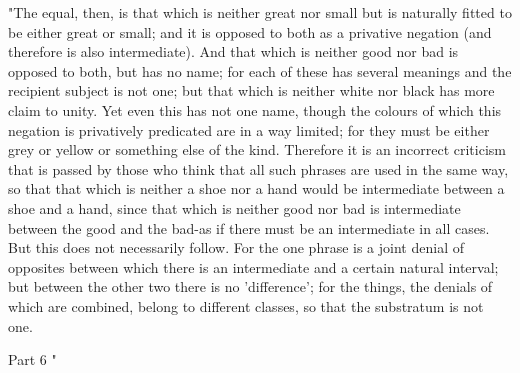 "The equal, then, is that which is neither great nor small but is
naturally fitted to be either great or small; and it is opposed to
both as a privative negation (and therefore is also intermediate).
And that which is neither good nor bad is opposed to both, but has
no name; for each of these has several meanings and the recipient
subject is not one; but that which is neither white nor black has
more claim to unity. Yet even this has not one name, though the colours
of which this negation is privatively predicated are in a way limited;
for they must be either grey or yellow or something else of the kind.
Therefore it is an incorrect criticism that is passed by those who
think that all such phrases are used in the same way, so that that
which is neither a shoe nor a hand would be intermediate between a
shoe and a hand, since that which is neither good nor bad is intermediate
between the good and the bad-as if there must be an intermediate in
all cases. But this does not necessarily follow. For the one phrase
is a joint denial of opposites between which there is an intermediate
and a certain natural interval; but between the other two there is
no 'difference'; for the things, the denials of which are combined,
belong to different classes, so that the substratum is not one.

Part 6 "

